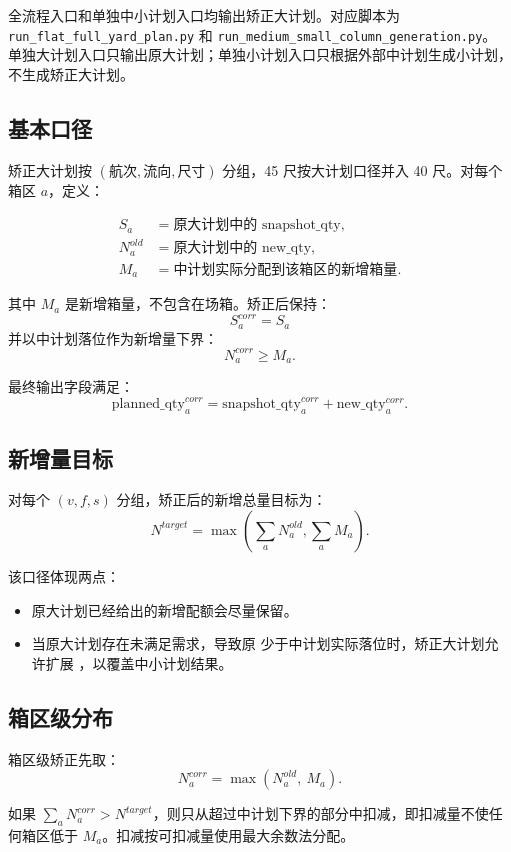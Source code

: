 \documentclass[UTF8,fontset=windows,zihao=-4]{ctexart}
\newcommand{\code}[1]{\texttt{\detokenize{#1}}}
\newcommand{\pathcode}[1]{\nolinkurl{#1}}
\begin{document}
全流程入口和单独中小计划入口均输出矫正大计划。对应脚本为
\pathcode{run_flat_full_yard_plan.py} 和
\pathcode{run_medium_small_column_generation.py}。
单独大计划入口只输出原大计划；单独小计划入口只根据外部中计划生成小计划，不生成矫正大计划。

\subsection{基本口径}

矫正大计划按 \((\text{航次}, \text{流向}, \text{尺寸})\) 分组，45 尺按大计划口径并入 40 尺。对每个箱区 \(a\)，定义：

\[
\begin{aligned}
S_a &= \text{原大计划中的 snapshot\_qty},\\
N^{old}_a &= \text{原大计划中的 new\_qty},\\
M_a &= \text{中计划实际分配到该箱区的新增箱量}.
\end{aligned}
\]

其中 \(M_a\) 是新增箱量，不包含在场箱。矫正后保持：
\[
S^{corr}_a = S_a
\]
并以中计划落位作为新增量下界：
\[
N^{corr}_a \ge M_a.
\]

最终输出字段满足：
\[
\text{planned\_qty}^{corr}_a
= \text{snapshot\_qty}^{corr}_a
+ \text{new\_qty}^{corr}_a.
\]

\subsection{新增量目标}

对每个 \((v,f,s)\) 分组，矫正后的新增总量目标为：
\[
N^{target}
= \max\left(
\sum_a N^{old}_a,
\sum_a M_a
\right).
\]

该口径体现两点：
\begin{itemize}
  \item 原大计划已经给出的新增配额会尽量保留。
  \item 当原大计划存在未满足需求，导致原 \code{new_qty} 少于中计划实际落位时，矫正大计划允许扩展 \code{new_qty}，以覆盖中小计划结果。
\end{itemize}

\subsection{箱区级分布}

箱区级矫正先取：
\[
N^{corr}_a = \max(N^{old}_a,\ M_a).
\]

如果 \(\sum_a N^{corr}_a > N^{target}\)，则只从超过中计划下界的部分中扣减，即扣减量不使任何箱区低于 \(M_a\)。扣减按可扣减量使用最大余数法分配。
\end{document}
